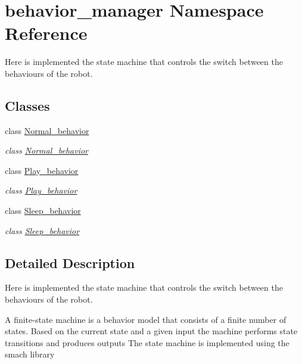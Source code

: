 \hypertarget{namespacebehavior__manager}{}\section{behavior\+\_\+manager Namespace Reference}
\label{namespacebehavior__manager}


Here is implemented the state machine that controls the switch between the behaviours of the robot.  


\subsection*{Classes}
\begin{DoxyCompactItemize}
\item 
class \hyperlink{classbehavior__manager_1_1Normal__behavior}{Normal\+\_\+behavior}
\begin{DoxyCompactList}\small\item\em class \hyperlink{classbehavior__manager_1_1Normal__behavior}{Normal\+\_\+behavior} \end{DoxyCompactList}\item 
class \hyperlink{classbehavior__manager_1_1Play__behavior}{Play\+\_\+behavior}
\begin{DoxyCompactList}\small\item\em class \hyperlink{classbehavior__manager_1_1Play__behavior}{Play\+\_\+behavior} \end{DoxyCompactList}\item 
class \hyperlink{classbehavior__manager_1_1Sleep__behavior}{Sleep\+\_\+behavior}
\begin{DoxyCompactList}\small\item\em class \hyperlink{classbehavior__manager_1_1Sleep__behavior}{Sleep\+\_\+behavior} \end{DoxyCompactList}\end{DoxyCompactItemize}


\subsection{Detailed Description}
Here is implemented the state machine that controls the switch between the behaviours of the robot. 

A finite-\/state machine is a behavior model that consists of a finite number of states. Based on the current state and a given input the machine performs state transitions and produces outputs The state machine is implemented using the smach library 